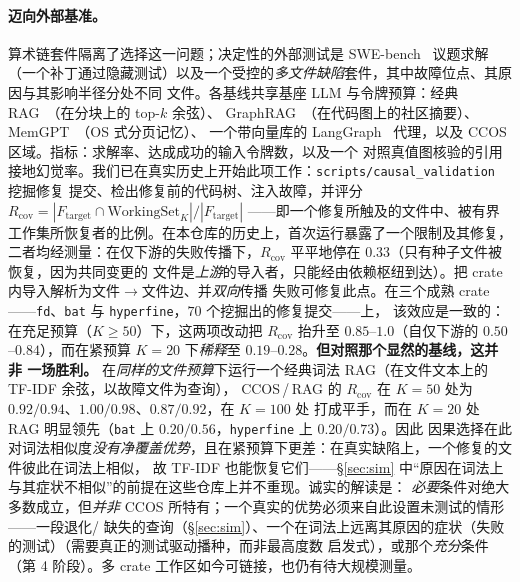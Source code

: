\documentclass[11pt]{ctexart}
\newcommand{\code}[1]{\texttt{#1}}
\begin{document}
\paragraph{迈向外部基准。} 算术链套件隔离了选择这一问题；决定性的外部测试是 SWE-bench~\cite{jimenez2023swebench}
议题求解（一个补丁通过隐藏测试）以及一个受控的\emph{多文件缺陷}套件，其中故障位点、其原因与其影响半径分处不同
文件。各基线共享基座 LLM 与令牌预算：经典 RAG~\cite{lewis2020rag}（在分块上的 top-$k$ 余弦）、
GraphRAG~\cite{edge2024graphrag}（在代码图上的社区摘要）、MemGPT~\cite{packer2023memgpt}（OS 式分页记忆）、
一个带向量库的 LangGraph~\cite{langgraph} 代理，以及 CCOS 区域。指标：求解率、达成成功的输入令牌数，以及一个
对照真值图核验的引用接地幻觉率。我们已在真实历史上开始此项工作：\code{scripts/causal\_validation} 挖掘修复
提交、检出修复前的代码树、注入故障，并评分
$R_{\mathrm{cov}} = |F_{\mathrm{target}} \cap \mathrm{WorkingSet}_K| / |F_{\mathrm{target}}|$
——即一个修复所触及的文件中、被有界工作集所恢复者的比例。在本仓库的历史上，首次运行暴露了一个限制及其修复，
二者均经测量：在仅下游的失败传播下，$R_{\mathrm{cov}}$ 平平地停在 $0.33$（只有种子文件被恢复，因为共同变更的
文件是\emph{上游}的导入者，只能经由依赖枢纽到达）。把 crate 内导入解析为文件$\to$文件边、并\emph{双向}传播
失败可修复此点。在三个成熟 crate——\code{fd}、\code{bat} 与 \code{hyperfine}，$70$ 个挖掘出的修复提交——上，
该效应是一致的：在充足预算（$K{\ge}50$）下，这两项改动把 $R_{\mathrm{cov}}$ 抬升至 $0.85$--$1.0$（自仅下游的
$0.50$--$0.84$），而在紧预算 $K{=}20$ 下\emph{稀释}至 $0.19$--$0.28$。\textbf{但对照那个显然的基线，这并非
一场胜利。} 在\emph{同样的文件预算}下运行一个经典词法 RAG（在文件文本上的 TF-IDF 余弦，以故障文件为查询），
CCOS\,/\,RAG 的 $R_{\mathrm{cov}}$ 在 $K{=}50$ 处为 $0.92/0.94$、$1.00/0.98$、$0.87/0.92$，在 $K{=}100$ 处
打成平手，而在 $K{=}20$ 处 RAG 明显领先（\code{bat} 上 $0.20/0.56$，\code{hyperfine} 上 $0.20/0.73$）。因此
因果选择在此对词法相似度\emph{没有净覆盖优势}，且在紧预算下更差：在真实缺陷上，一个修复的文件彼此在词法上相似，
故 TF-IDF 也能恢复它们——\S\ref{sec:sim} 中“原因在词法上与其症状不相似”的前提在这些仓库上并不重现。诚实的解读是：
\emph{必要}条件对绝大多数成立，但\emph{并非} CCOS 所特有；一个真实的优势必须来自此设置未测试的情形——一段退化/
缺失的查询（\S\ref{sec:sim}）、一个在词法上远离其原因的症状（失败的测试）（需要真正的测试驱动播种，而非最高度数
启发式），或那个\emph{充分}条件（第 4 阶段）。多 crate 工作区如今可链接，也仍有待大规模测量。
\end{document}

